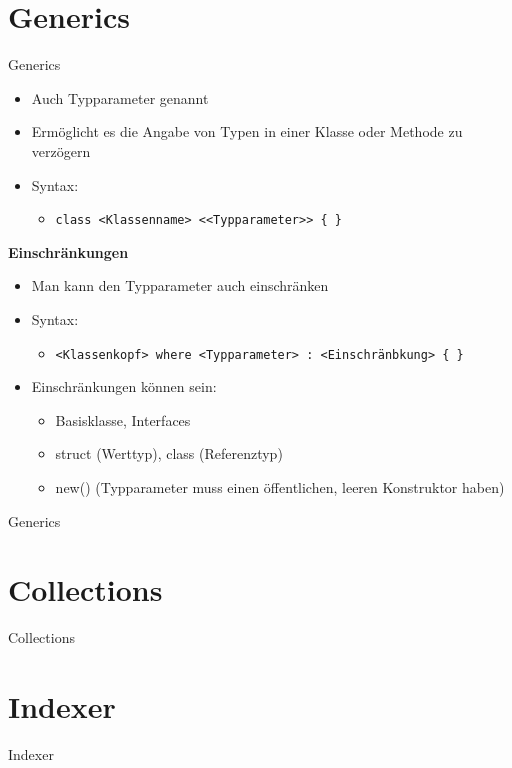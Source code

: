 \section{Generics}
\begin{frame}{Generics}
	\begin{itemize}
		\item Auch Typparameter genannt
		\item Ermöglicht es die Angabe von Typen in einer Klasse oder Methode zu verzögern
		\item Syntax:
		\begin{itemize}
			\item \texttt{class \alert{<Klassenname>} <\alert{<Typparameter>}> \{ \}}
		\end{itemize}
	\end{itemize}
	\textbf{Einschränkungen}\\
	\begin{itemize}
		\item Man kann den Typparameter auch einschränken
		\item Syntax:
		\begin{itemize}
			\item \texttt{\alert{<Klassenkopf>} where \alert{<Typparameter>} : \alert{<Einschränbkung>} \{ \}}
		\end{itemize}
		\item Einschränkungen können sein:
		\begin{itemize}
			\item Basisklasse, Interfaces
			\item struct (Werttyp), class (Referenztyp)
			\item new() (Typparameter muss einen öffentlichen, leeren Konstruktor haben)
		\end{itemize}
	\end{itemize}
\end{frame}

\begin{frame}{Generics}
	
	
\end{frame}

\section{Collections}
\begin{frame}{Collections}
\end{frame}

\section{Indexer}
\begin{frame}{Indexer}

\end{frame}


